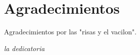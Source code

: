 \section*{\qquad \qquad \qquad \qquad Agradecimientos}

Agradecimientos por las "risas y el vacilon".

\cleardoublepage
\thispagestyle{empty}
\begin{flushright}
\itshape
la dedicatoria
\end{flushright}
